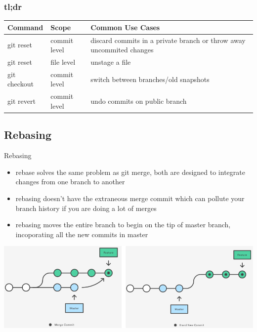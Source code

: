 \documentclass[12pt]{beamer}
\begin{document}
\begin{frame}
\frametitle{tl;dr}
\begin{table}[]
	\begin{tabular}{l|l|l}
		Command      & Scope        & Common Use Cases                                                     \\
		\hline
		git reset    & commit level & discard commits in a private branch or throw away uncommited changes \\
		git reset    & file level   & unstage a file                                                       \\
		git checkout & commit level & switch between branches/old snapshots                                \\
		git revert   & commit level & undo commits on public branch                                       
	\end{tabular}
\end{table}
\end{frame}

\subsection{Rebasing}
\begin{frame}{Rebasing}
\begin{itemize}
	\item rebase solves the same problem as git merge, both are designed to integrate changes from one branch to another
	\item rebasing doesn't have the extraneous merge commit which can pollute your branch history if you are doing a lot of merges
	\item rebasing moves the entire branch to begin on the tip of master branch, incoporating all the new commits in master
\end{itemize}
\begin{center}
	\includegraphics[width=\linewidth]{merge_vs_rebase}
\end{center}
\end{frame}
\end{document}
